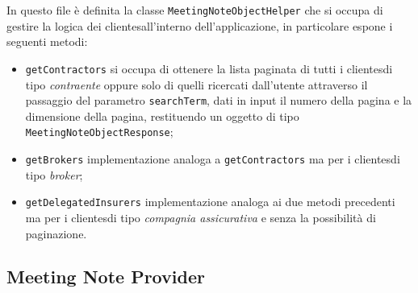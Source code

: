 In questo file è definita la classe \lstinline{MeetingNoteObjectHelper} che si occupa di gestire la logica dei \glspl{cliente}\glsoccur all'interno dell'applicazione, in particolare espone i seguenti metodi:
\begin{itemize}
    \item \lstinline{getContractors} si occupa di ottenere la lista paginata di tutti i \glspl{cliente}\glsoccur di tipo \emph{contraente} oppure solo di quelli ricercati dall'utente attraverso il passaggio del parametro \lstinline{searchTerm}, dati in input il numero della pagina e la dimensione della pagina, restituendo un oggetto di tipo \lstinline{MeetingNoteObjectResponse};
    \item \lstinline{getBrokers} implementazione analoga a \lstinline{getContractors} ma per i \glspl{cliente}\glsoccur di tipo \emph{broker};
    \item \lstinline{getDelegatedInsurers} implementazione analoga ai due metodi precedenti ma per i \glspl{cliente}\glsoccur di tipo \emph{compagnia assicurativa} e senza la possibilità di paginazione.
\end{itemize}

\subsection{Meeting Note Provider}
\label{subsec:meeting-note-provider}

